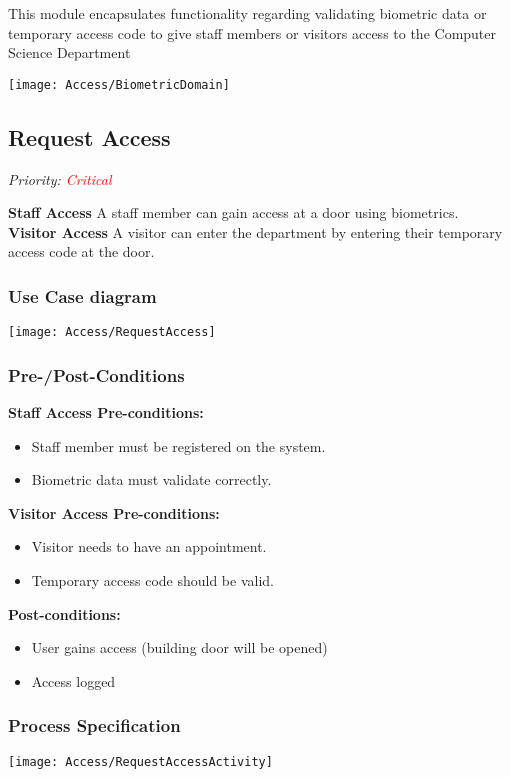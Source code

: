 
This module encapsulates functionality regarding validating biometric data or temporary access code to give staff members or visitors access to the Computer Science Department

\texttt{[image: Access/BiometricDomain]}

\subsection{Request Access}
\textit{ Priority: \textcolor{red}{Critical}} 

\textbf{Staff Access} A staff member can gain access at a door using biometrics. \\
\textbf{Visitor Access} A visitor can enter the department by entering their temporary access code at the door.

\subsubsection{Use Case diagram}
\texttt{[image: Access/RequestAccess]}

\subsubsection{Pre-/Post-Conditions}
\textbf{Staff Access Pre-conditions:} 
	\begin{itemize}
		\item Staff member must be registered on the system.
		\item Biometric data must validate correctly.
	\end{itemize}
\textbf{Visitor Access Pre-conditions:} 
	\begin{itemize}
		\item Visitor needs to have an appointment.
		\item Temporary access code should be valid.
	\end{itemize}
\textbf{ Post-conditions:} 
	\begin{itemize}
		\item User gains access (building door will be opened)
		\item Access logged
	\end{itemize}
	
\subsubsection{Process Specification}
	\texttt{[image: Access/RequestAccessActivity]}	

